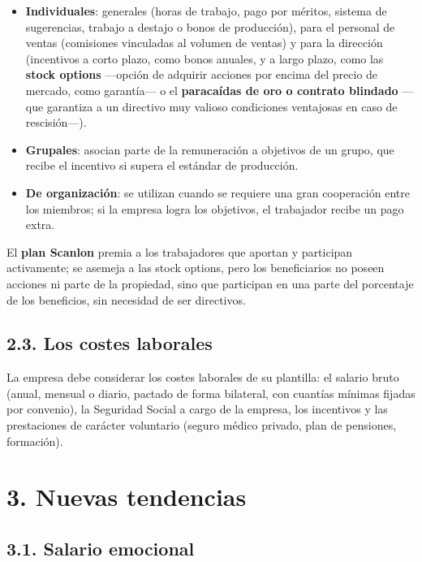 \documentclass[12pt]{book} %
\providecommand{\tightlist}{%
  \setlength{\itemsep}{0pt}\setlength{\parskip}{0pt}}
\begin{document}
\begin{itemize}
\tightlist
\item
  \textbf{Individuales}: generales (horas de trabajo, pago por méritos,
  sistema de sugerencias, trabajo a destajo o bonos de producción), para
  el personal de ventas (comisiones vinculadas al volumen de ventas) y
  para la dirección (incentivos a corto plazo, como bonos anuales, y a
  largo plazo, como las \textbf{stock options} ---opción de adquirir
  acciones por encima del precio de mercado, como garantía--- o el
  \textbf{paracaídas de oro o contrato blindado} ---que garantiza a un
  directivo muy valioso condiciones ventajosas en caso de rescisión---).
\item
  \textbf{Grupales}: asocian parte de la remuneración a objetivos de un
  grupo, que recibe el incentivo si supera el estándar de producción.
\item
  \textbf{De organización}: se utilizan cuando se requiere una gran
  cooperación entre los miembros; si la empresa logra los objetivos, el
  trabajador recibe un pago extra.
\end{itemize}

El \textbf{plan Scanlon} premia a los trabajadores que aportan y
participan activamente; se asemeja a las stock options, pero los
beneficiarios no poseen acciones ni parte de la propiedad, sino que
participan en una parte del porcentaje de los beneficios, sin necesidad
de ser directivos.

\hypertarget{los-costes-laborales}{%
\subsection{2.3. Los costes laborales}\label{los-costes-laborales}}

La empresa debe considerar los costes laborales de su plantilla: el
salario bruto (anual, mensual o diario, pactado de forma bilateral, con
cuantías mínimas fijadas por convenio), la Seguridad Social a cargo de
la empresa, los incentivos y las prestaciones de carácter voluntario
(seguro médico privado, plan de pensiones, formación).

\hypertarget{nuevas-tendencias}{%
\section{3. Nuevas tendencias}\label{nuevas-tendencias}}

\hypertarget{salario-emocional}{%
\subsection{3.1. Salario emocional}\label{salario-emocional}}
\end{document}
